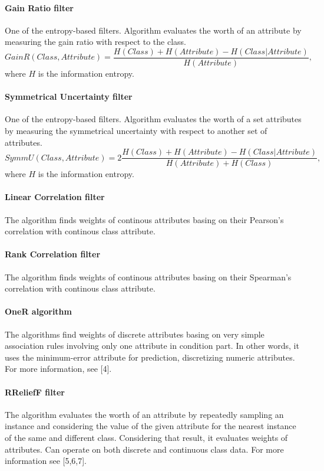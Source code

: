 \documentclass[10pt]{article}\usepackage[]{graphicx}\usepackage[]{color}
\begin{document}
\paragraph{Gain Ratio filter}
One of the entropy-based filters. Algorithm evaluates the worth of an attribute by measuring the gain ratio with respect to the class.
$$GainR(Class, Attribute) = \frac{H(Class) + H(Attribute) - H(Class | Attribute)}{H(Attribute)},$$
where $H$ is the information entropy. 

\paragraph{Symmetrical Uncertainty filter}
One of the entropy-based filters. Algorithm evaluates the worth of a set attributes by measuring the symmetrical uncertainty with respect to another set of attributes. 
$$SymmU(Class, Attribute)= 2\frac{H(Class) + H(Attribute) - H(Class| Attribute)}{H(Attribute) + H(Class)},$$
where $H$ is the information entropy. 

\paragraph{Linear Correlation filter}
The algorithm finds weights of continous attributes basing on their Pearson's correlation with continous class attribute.

\paragraph{Rank Correlation filter}
The algorithm finds weights of continous attributes basing on their Spearman's correlation with continous class attribute.

\paragraph{OneR algorithm}
The algorithms find weights of discrete attributes basing on very simple association rules involving only one attribute in condition part. In other words, it uses the minimum-error attribute for prediction, discretizing numeric attributes. For more information, see [4]. 

\paragraph{RReliefF filter}
The algorithm evaluates the worth of an attribute by repeatedly sampling an instance and considering the value of the given attribute for the nearest instance of the same and different class. Considering that result, it evaluates weights of attributes. Can operate on both discrete and continuous class data. For more information see [5,6,7]. 
\end{document}
